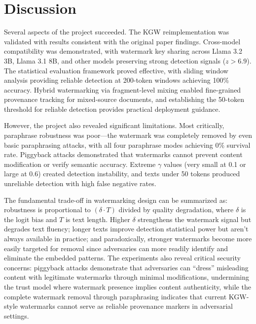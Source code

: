 \documentclass[12pt,letterpaper]{article}
\begin{document}
\section{Discussion}

Several aspects of the project succeeded. The KGW reimplementation was validated with results consistent with the original paper findings. Cross-model compatibility was demonstrated, with watermark key sharing across Llama 3.2 3B, Llama 3.1 8B, and other models preserving strong detection signals ($z > 6.9$). The statistical evaluation framework proved effective, with sliding window analysis providing reliable detection at 200-token windows achieving 100\% accuracy. Hybrid watermarking via fragment-level mixing enabled fine-grained provenance tracking for mixed-source documents, and establishing the 50-token threshold for reliable detection provides practical deployment guidance.

However, the project also revealed significant limitations. Most critically, paraphrase robustness was poor---the watermark was completely removed by even basic paraphrasing attacks, with all four paraphrase modes achieving 0\% survival rate. Piggyback attacks demonstrated that watermarks cannot prevent content modification or verify semantic accuracy. Extreme $\gamma$ values (very small at 0.1 or large at 0.6) created detection instability, and texts under 50 tokens produced unreliable detection with high false negative rates.

The fundamental trade-off in watermarking design can be summarized as: robustness is proportional to $(\delta \cdot T)$ divided by quality degradation, where $\delta$ is the logit bias and $T$ is text length. Higher $\delta$ strengthens the watermark signal but degrades text fluency; longer texts improve detection statistical power but aren't always available in practice; and paradoxically, stronger watermarks become more easily targeted for removal since adversaries can more readily identify and eliminate the embedded patterns. The experiments also reveal critical security concerns: piggyback attacks demonstrate that adversaries can ``dress'' misleading content with legitimate watermarks through minimal modifications, undermining the trust model where watermark presence implies content authenticity, while the complete watermark removal through paraphrasing indicates that current KGW-style watermarks cannot serve as reliable provenance markers in adversarial settings.
\end{document}
